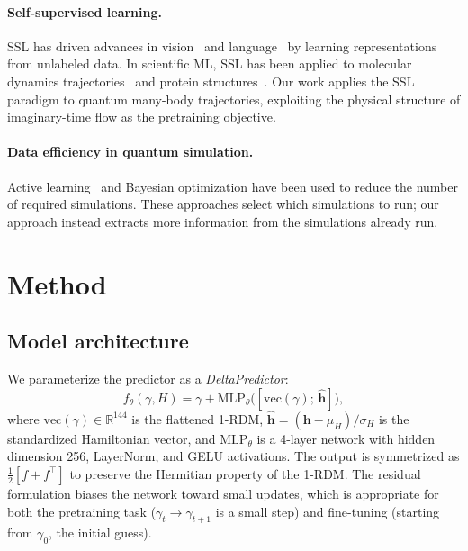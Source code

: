 \documentclass[12pt]{article}
\newcommand{\gam}{\gamma}
\newcommand{\Hv}{\mathbf{h}}
\begin{document}
\paragraph{Self-supervised learning.}
SSL has driven advances in vision~\citep{chen2020simple} and language~\citep{devlin2019bert}
by learning representations from unlabeled data.
In scientific ML, SSL has been applied to molecular dynamics
trajectories~\citep{hu2021forcenet} and protein structures~\citep{jumper2021alphafold}.
Our work applies the SSL paradigm to quantum many-body trajectories, exploiting the
physical structure of imaginary-time flow as the pretraining objective.

\paragraph{Data efficiency in quantum simulation.}
Active learning~\citep{smith2018less} and Bayesian optimization have been used
to reduce the number of required simulations.
These approaches select which simulations to run; our approach instead extracts
more information from the simulations already run.

\section{Method}
\label{sec:method}

\subsection{Model architecture}

We parameterize the predictor as a \emph{DeltaPredictor}:
\begin{equation}
  f_\theta(\gam, H) = \gam + \mathrm{MLP}_\theta\bigl([\mathrm{vec}(\gam);\, \hat{\Hv}]\bigr),
\label{eq:model}
\end{equation}
where $\mathrm{vec}(\gam) \in \mathbb{R}^{144}$ is the flattened 1-RDM,
$\hat{\Hv} = (\Hv - \mu_H)/\sigma_H$ is the standardized Hamiltonian vector,
and $\mathrm{MLP}_\theta$ is a 4-layer network with hidden dimension 256, LayerNorm,
and GELU activations.
The output is symmetrized as $\tfrac{1}{2}[f + f^\top]$ to preserve the Hermitian
property of the 1-RDM.
The residual formulation biases the network toward small updates, which is
appropriate for both the pretraining task ($\gam_t \to \gam_{t+1}$ is a small step)
and fine-tuning (starting from $\gam_0$, the initial guess).
\end{document}
